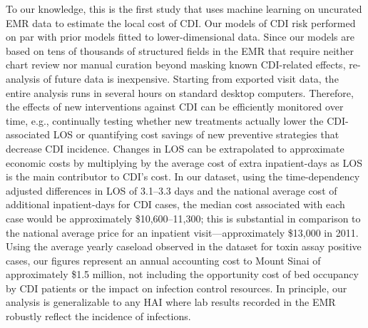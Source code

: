 To our knowledge, this is the first study that uses machine learning on uncurated EMR data to estimate the local cost of CDI. Our models of CDI risk performed on par with prior models fitted to lower-dimensional data.\autocite{Dubberke2011,Tanner2009,Wiens2014} Since our models are based on tens of thousands of structured fields in the EMR that require neither chart review nor manual curation beyond masking known CDI-related effects, re-analysis of future data is inexpensive. Starting from exported visit data, the entire analysis runs in several hours on standard desktop computers. Therefore, the effects of new interventions against CDI can be efficiently monitored over time, e.g., continually testing whether new treatments actually lower the CDI-associated LOS or quantifying cost savings of new preventive strategies that decrease CDI incidence. Changes in LOS can be extrapolated to approximate economic costs by multiplying by the average cost of extra inpatient-days as LOS is the main contributor to CDI’s cost.\autocite{Graves2010,McGlone2012,Wilcox1996,Zimlichman2013} In our dataset, using the time-dependency adjusted differences in LOS of 3.1–3.3 days and the national average cost of additional inpatient-days for CDI cases,\autocite{Zimlichman2013} the median cost associated with each case would be approximately \$10,600–11,300; this is substantial in comparison to the national average price for an inpatient visit—approximately \$13,000 in 2011.\autocite{Cooper2015} Using the average yearly caseload observed in the dataset for toxin assay positive cases, our figures represent an annual accounting cost to Mount Sinai of approximately \$1.5 million, not including the opportunity cost of bed occupancy by CDI patients or the impact on infection control resources.\autocite{Graves2010} In principle, our analysis is generalizable to any HAI where lab results recorded in the EMR robustly reflect the incidence of infections.

